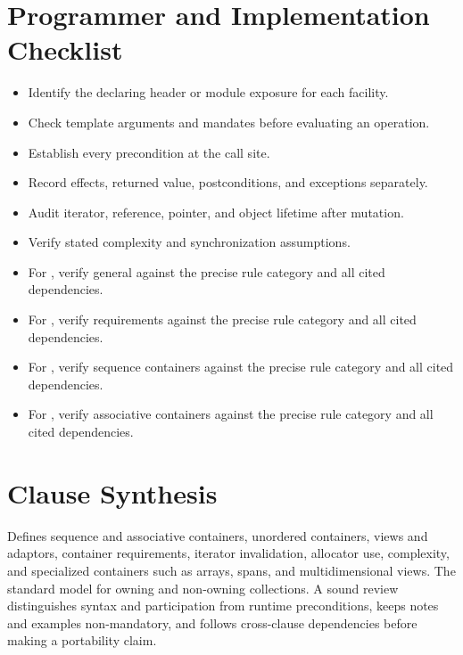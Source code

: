 \documentclass[11pt,letterpaper]{article}
\begin{document}
\section{Programmer and Implementation Checklist}
\begin{CornellReferenceChecklistBox}\begin{itemize}[label=$\square$]
\item Identify the declaring header or module exposure for each facility.
\item Check template arguments and mandates before evaluating an operation.
\item Establish every precondition at the call site.
\item Record effects, returned value, postconditions, and exceptions separately.
\item Audit iterator, reference, pointer, and object lifetime after mutation.
\item Verify stated complexity and synchronization assumptions.
\item For , verify general against the precise rule category and all cited dependencies.
\item For , verify requirements against the precise rule category and all cited dependencies.
\item For , verify sequence containers against the precise rule category and all cited dependencies.
\item For , verify associative containers against the precise rule category and all cited dependencies.
\end{itemize}\end{CornellReferenceChecklistBox}
\section{Clause Synthesis}
\begin{CornellReferenceOrientationBox}Defines sequence and associative containers, unordered containers, views and adaptors, container requirements, iterator invalidation, allocator use, complexity, and specialized containers such as arrays, spans, and multidimensional views. The standard model for owning and non-owning collections. A sound review distinguishes syntax and participation from runtime preconditions, keeps notes and examples non-mandatory, and follows cross-clause dependencies before making a portability claim.\end{CornellReferenceOrientationBox}
\end{document}
